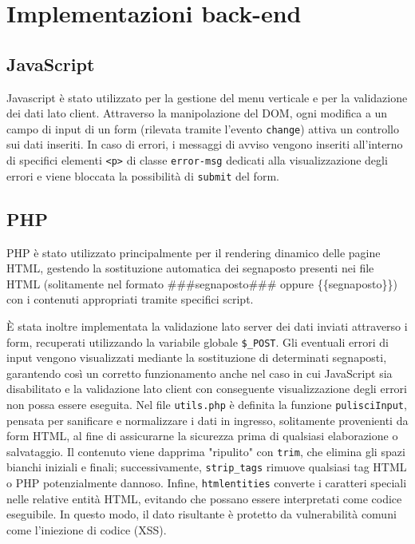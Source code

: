 \documentclass{article}
\begin{document}
\newpage


\section{Implementazioni back-end}



\subsection{JavaScript}

Javascript è stato utilizzato per la gestione del menu verticale e per la validazione dei dati lato client.
Attraverso la manipolazione del DOM, ogni modifica a un campo di input di un form (rilevata tramite l'evento \texttt{change}) attiva un controllo sui dati inseriti.
In caso di errori, i messaggi di avviso vengono inseriti all'interno di specifici elementi \texttt{<p>} di classe \texttt{error-msg} dedicati alla visualizzazione degli errori e viene bloccata la possibilità di \texttt{submit} del form.

\subsection{PHP}

PHP è stato utilizzato principalmente per il rendering dinamico delle pagine HTML, gestendo la sostituzione automatica dei segnaposto presenti nei file HTML (solitamente nel formato \#\#\#segnaposto\#\#\# oppure \{\{segnaposto\}\}) con i contenuti appropriati tramite specifici script.

È stata inoltre implementata la validazione lato server dei dati inviati attraverso i form, recuperati utilizzando la variabile globale \texttt{\$\_POST}. Gli eventuali errori di input vengono visualizzati mediante la sostituzione di determinati segnaposti, garantendo così un corretto funzionamento anche nel caso in cui JavaScript sia disabilitato e la validazione lato client con conseguente visualizzazione degli errori non possa essere eseguita.
Nel file \texttt{utils.php} è definita la funzione \texttt{pulisciInput}, pensata per sanificare e normalizzare i dati in ingresso, solitamente provenienti da form HTML, al fine di assicurarne la sicurezza prima di qualsiasi elaborazione o salvataggio.
Il contenuto viene dapprima "ripulito" con \texttt{trim}, che elimina gli spazi bianchi iniziali e finali; successivamente, \texttt{strip\_tags} rimuove qualsiasi tag HTML o PHP potenzialmente dannoso.
Infine, \texttt{htmlentities} converte i caratteri speciali nelle relative entità HTML, evitando che possano essere interpretati come codice eseguibile.
In questo modo, il dato risultante è protetto da vulnerabilità comuni come l'iniezione di codice (XSS).
\end{document}
